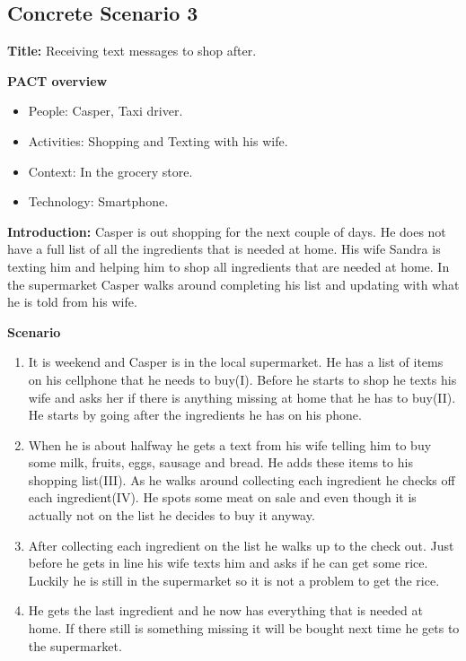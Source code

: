 \subsection{Concrete Scenario 3} \label{ConcreteScenario3}

\textbf{Title:} Receiving text messages to shop after.

\textbf{PACT overview}
\begin{itemize}
\item People: Casper, Taxi driver.  
\item Activities: Shopping and Texting with his wife.
\item Context: In the grocery store.
\item Technology: Smartphone.
\end{itemize}

\textbf{Introduction:} Casper is out shopping for the next couple of days. He does not have a full list of all the ingredients that is needed at home. His wife Sandra is texting him and helping him to shop all ingredients that are needed at home. In the supermarket Casper walks around completing his list and updating with what he is told from his wife.  

\textbf{Scenario}
\begin{enumerate}
\item It is weekend and Casper is in the local supermarket. He has a list of items on his cellphone that he needs to buy(I). Before he starts to shop he texts his wife and asks her if there is anything missing at home that he has to buy(II). He starts by going after the ingredients he has on his phone.   
\item  When he is about halfway he gets a text from his wife telling him to buy some milk, fruits, eggs, sausage and bread. He adds these items to his shopping list(III). As he walks around collecting each ingredient he checks off each ingredient(IV). He spots some meat on sale and even though it is actually not on the list he decides to buy it anyway.  
\item After collecting each ingredient on the list he walks up to the check out. Just before he gets in line his wife texts him and asks if he can get some rice. Luckily he is still in the supermarket so it is not a problem to get the rice.  
\item He gets the last ingredient and he now has everything that is needed at home. If there still is something missing it will be bought next time he gets to the supermarket.
\end{enumerate}

